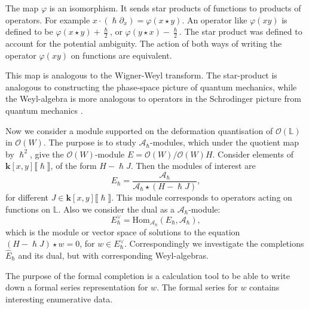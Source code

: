     The map \(\varphi\) is an isomorphism. It sends star products of functions to products of operators.  For example \( x \cdot ( \hslash \partial_x ) = \varphi( x \star y)\). An operator like \( \varphi(xy)\) is defined to be \( \varphi(x \star y) + \frac{\hslash}{2}\), or \( \varphi(y \star x ) - \frac{\hslash}{2}\).  The star product was defined to account for the potential ambiguity. The action of both ways of writing the operator \( \varphi(xy) \) on functions are equivalent. 
    
    This map is analogous to the Wigner-Weyl transform. The star-product is analogous to constructing the phase-space picture of quantum mechanics, while the Weyl-algebra is more analogous to operators in the Schrodinger picture from quantum mechanics \cite{baker}.
    
    Now we consider a module supported on the deformation quantisation of  \( \mathcal{O}(\mathbb{L})\) in \( \mathcal{O}(W)\). The purpose is to study \(\mathcal{A}_{\hslash}\)-modules, which under the quotient map by \(\hslash^2\), give the \(\mathcal{O}(W)\)-module \(E =\mathcal{O}(W)/ \mathcal{O}(W) H  \). Consider elements of \( \mathbf{k}[x,y]\lBrack\hslash\rBrack\), of the form \(H - \hslash J\). 
    Then the modules of interest are
    \begin{equation}  
    E_{\hslash} = \frac{\mathcal{A}_{\hslash}}{  \mathcal{A}_{\hslash} \star  (H - \hslash J)  } ,
    \end{equation}
    for different \(J \in \mathbf{k}[x,y]\lBrack\hslash\rBrack\). This module corresponds to operators acting on functions on \( \mathbb{L}\). Also we consider the dual as a \( \mathcal{A}_\hslash\)-module:
    \begin{equation} 
    E_{\hslash}^{\vee} = \mathrm{Hom}_{ \mathcal{A}_{\hslash} }\left(E_{\hslash}, \mathcal{A}_{\hslash} \right),
    \end{equation}
    which is the module or vector space of solutions to the equation \( (H - \hslash J) \star w =0\), for \( w \in  E_{\hslash}^{\vee}\). Correspondingly we investigate the completions \( \widehat{E}_{\hslash}\) and its dual, but with corresponding Weyl-algebras. 
    
    The purpose of the formal completion is a calculation tool to be able to write down a formal series representation for \(w\). The formal series for \(w\) contains interesting enumerative data. 
    

